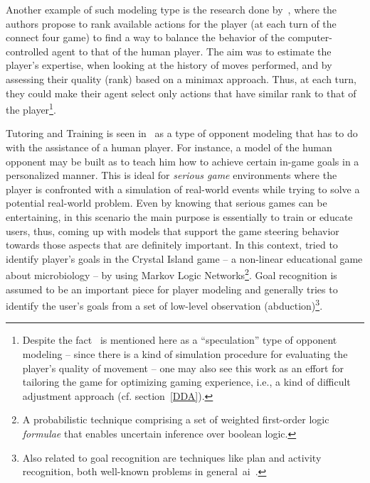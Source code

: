 Another example of such modeling type is the research done by~\cite{missura_online_2008}, where the authors propose to rank available actions for the player (at each turn of the connect four game) to find a way to balance the behavior of the computer-controlled agent to that of the human player. The aim was to estimate the player's expertise, when looking at the history of moves performed, and by assessing their quality (rank) based on a minimax approach.  Thus, at each turn, they could make their agent select only actions that have similar rank to that of the player\footnote{Despite the fact~\cite{missura_online_2008} is mentioned here as a ``speculation'' type of opponent modeling -- since there is a kind of simulation procedure for evaluating the player's quality of movement -- one may also see this work as an effort for tailoring the game for optimizing gaming experience, i.e., a kind of difficult adjustment approach (cf. section~\ref{DDA}).}.

Tutoring and Training is seen in~\cite{herik_opponent_2005} as a type of opponent modeling that has to do with the assistance of a human player. For instance, a model of the human opponent may be built as to teach him how to achieve certain in-game goals in a personalized manner. This is ideal for \textit{serious game} environments where the player is confronted with a simulation of real-world events while trying to solve a potential real-world problem. Even by knowing that serious games can be entertaining, in this scenario the main purpose is essentially to train or educate users, thus, coming up with models that support the game steering behavior towards those aspects that are definitely important. In this context, \cite{ha_goal_2011} tried to identify player's goals in the Crystal Island game -- a non-linear educational game about microbiology -- by using Markov Logic Networks\footnote{A probabilistic technique comprising a set of weighted first-order logic \textit{formulae} that enables uncertain inference over boolean logic. }. Goal recognition is assumed to be an important piece for player modeling and generally tries to identify the user's goals from a set of low-level observation (abduction)\footnote{Also related to goal recognition are techniques like plan and activity recognition, both well-known problems in general~\gls{ai}~\cite{ha_goal_2011}.}. 

